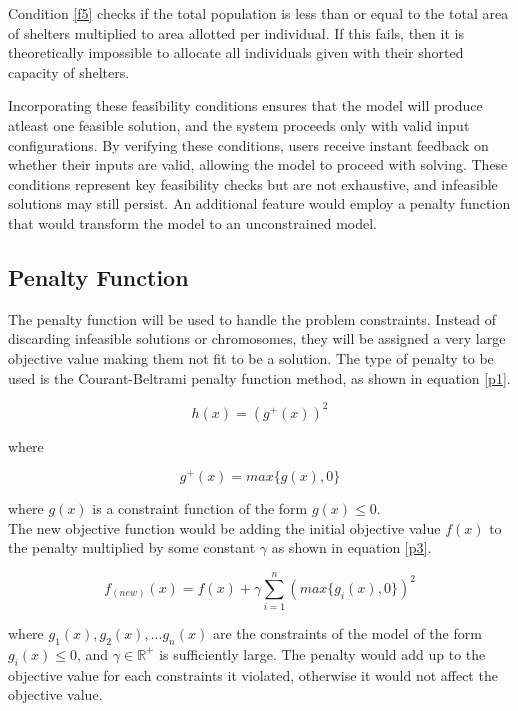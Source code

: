 	Condition \ref{f5} checks if the total population is less than or equal to the total area of shelters multiplied to area allotted per individual. If this fails, then it is theoretically impossible to allocate all individuals given with their shorted capacity of shelters.
	
	Incorporating these feasibility conditions ensures that the model will produce atleast one feasible solution, and the system proceeds only with valid input configurations. By verifying these conditions, users receive instant feedback on whether their inputs are valid, allowing the model to proceed with solving. These conditions represent key feasibility checks but are not exhaustive, and infeasible solutions may still persist. An additional feature would employ a penalty function that would transform the model to an unconstrained model.	
	
\subsection{Penalty Function}
	The penalty function will be used to handle the problem constraints. Instead of discarding infeasible solutions or chromosomes, they will be assigned a very large objective value making them not fit to be a solution. The type of penalty to be used is the Courant-Beltrami penalty function method, as shown in equation \ref{p1}.
	
	\begin{equation} 
		\label{p1}
		h(x)=(g^+(x))^2
	\end{equation}
	
	where
	
	\begin{equation} 
		\label{p2}
		g^+(x)=max\{g(x),0\}
	\end{equation}
	
	where $g(x)$ is a constraint function of the form $g(x)\le0$. 
	\\
	The new objective function would be adding the initial objective value $f(x)$ to the penalty multiplied by some constant $\gamma$ as shown in equation \ref{p3}.
	
	\begin{equation} 
		\label{p3}
		f_(new)(x)=f(x)+\gamma\sum_{i=1}^{n}(max\{g_i(x),0\})^2
	\end{equation}
	
	where $g_1(x),g_2(x),...g_n(x)$ are the constraints of the model of the form $g_i(x)\le0$, and $\gamma\in\mathbb{R}^+$ is sufficiently large. The penalty would add up to the objective value for each constraints it violated, otherwise it would not affect the objective value.	
	
